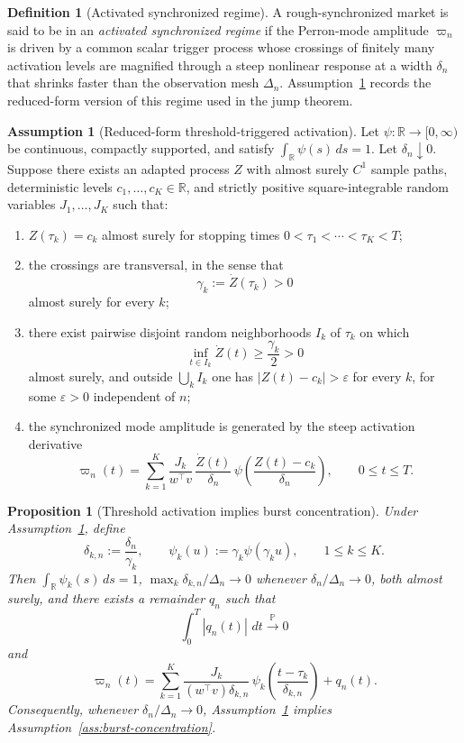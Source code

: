 \documentclass[11pt,a4paper]{amsart}
\theoremstyle{plain}
\newtheorem{proposition}[theorem]{Proposition}
\theoremstyle{definition}
\newtheorem{definition}[theorem]{Definition}
\newtheorem{assumption}[theorem]{Assumption}
\theoremstyle{remark}
\newcommand{\R}{\mathbb{R}}
\newcommand{\PP}{\mathbb{P}}
\newcommand{\dd}{\,d}
\newcommand{\toP}{\xrightarrow{\PP}}
\begin{document}
\begin{definition}[Activated synchronized regime]\label{def:activated-sync}
A rough-synchronized market is said to be in an \emph{activated synchronized regime} if the
Perron-mode amplitude \(\varpi_n\) is driven by a common scalar trigger process whose crossings of
finitely many activation levels are magnified through a steep nonlinear response at a width
\(\delta_n\) that shrinks faster than the observation mesh \(\Delta_n\).  Assumption~\ref{ass:threshold-activation}
records the reduced-form version of this regime used in the jump theorem.
\end{definition}

\begin{assumption}[Reduced-form threshold-triggered activation]\label{ass:threshold-activation}
Let \(\psi\colon\R\to[0,\infty)\) be continuous, compactly supported, and satisfy
\(\int_{\R}\psi(s)\dd s=1\).  Let \(\delta_n\downarrow0\).  Suppose there exists an adapted process
\(Z\) with almost surely \(C^1\) sample paths, deterministic levels \(c_1,\dots,c_K\in\R\), and
strictly positive square-integrable random variables \(J_1,\dots,J_K\) such that:
\begin{enumerate}[label=(\roman*)]
\item \(Z(\tau_k)=c_k\) almost surely for stopping times \(0<\tau_1<\cdots<\tau_K<T\);
\item the crossings are transversal, in the sense that
\[
        \gamma_k:=\dot Z(\tau_k)>0
\]
almost surely for every \(k\);
\item there exist pairwise disjoint random neighborhoods \(I_k\) of \(\tau_k\) on which
\[
        \inf_{t\in I_k}\dot Z(t)\ge \frac{\gamma_k}{2}>0
\]
almost surely, and outside \(\bigcup_k I_k\) one has \(|Z(t)-c_k|>\varepsilon\) for every \(k\),
for some \(\varepsilon>0\) independent of \(n\);
\item the synchronized mode amplitude is generated by the steep activation derivative
\[
        \varpi_n(t)
        =
        \sum_{k=1}^K
        \frac{J_k}{w^\top v}\,
        \frac{\dot Z(t)}{\delta_n}\,
        \psi\!\left(\frac{Z(t)-c_k}{\delta_n}\right),
        \qquad
        0\le t\le T.
\]
\end{enumerate}
\end{assumption}

\begin{proposition}[Threshold activation implies burst concentration]\label{prop:threshold-bridge}
Under Assumption~\ref{ass:threshold-activation}, define
\[
        \delta_{k,n}:=\frac{\delta_n}{\gamma_k},
        \qquad
        \psi_k(u):=\gamma_k \psi(\gamma_k u),
        \qquad
        1\le k\le K.
\]
Then \(\int_{\R}\psi_k(s)\dd s=1\), \(\max_k \delta_{k,n}/\Delta_n\to0\) whenever
\(\delta_n/\Delta_n\to0\), both almost surely, and there exists a remainder \(q_n\) such that
\[
        \int_0^T |q_n(t)|\,\dd t\toP0
\]
and
\[
        \varpi_n(t)
        =
        \sum_{k=1}^K
        \frac{J_k}{(w^\top v)\delta_{k,n}}\,
        \psi_k\!\left(\frac{t-\tau_k}{\delta_{k,n}}\right)
        +
        q_n(t).
\]
Consequently, whenever \(\delta_n/\Delta_n\to0\), Assumption~\ref{ass:threshold-activation}
implies Assumption~\ref{ass:burst-concentration}.
\end{proposition}
\end{document}
